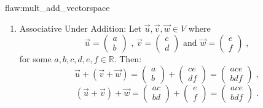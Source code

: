 \begin{flaw}{flaw:mult_add_vectorspace}
\begin{enumerate}
\item Associative Under Addition: Let $\vec{u}, \vec{v}, \vec{w} \in V$ where $$ \vec{u} = \begin{pmatrix}
a \\
b
\end{pmatrix} \text{ , } \vec{v} = \begin{pmatrix}
c \\
d
\end{pmatrix} \text{ and } \vec{w} = \begin{pmatrix}
e \\
f
\end{pmatrix}\;,$$
for some $a,b,c,d,e,f \in \mathbb{R}.$ Then:
$$\vec{u} + \left(\vec{v}+\vec{w}\right) = \begin{pmatrix}
a \\
b
\end{pmatrix} + \begin{pmatrix}
ce \\
df
\end{pmatrix} = \begin{pmatrix}
ace \\
bdf
\end{pmatrix}\;,$$
$$\left(\vec{u} + \vec{v}\right)+\vec{w} = \begin{pmatrix}
ac \\
bd
\end{pmatrix} + \begin{pmatrix}
e \\
f
\end{pmatrix} = \begin{pmatrix}
ace \\
bdf
\end{pmatrix}\;.$$


\end{enumerate}
\end{flaw}

